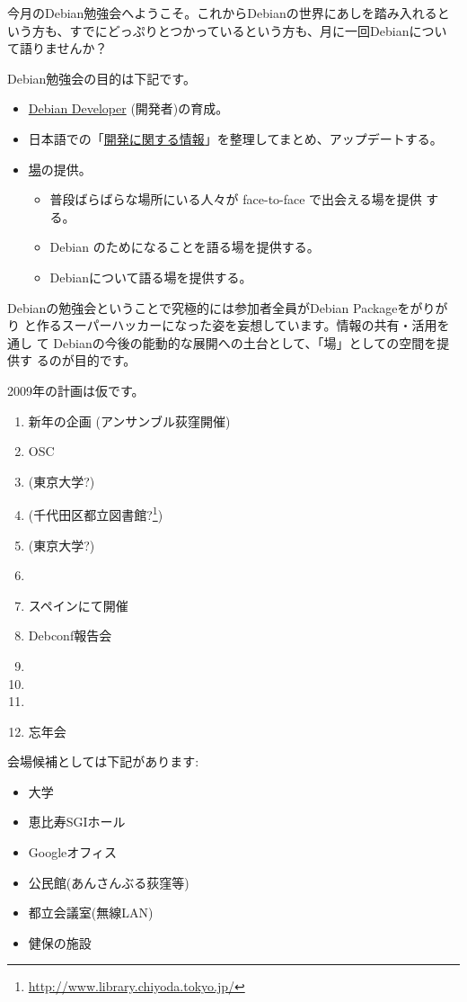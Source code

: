 \documentclass[mingoth,a4paper]{jsarticle}
\begin{document}
\begin{multicols}{2}
 
 
 今月のDebian勉強会へようこそ。これからDebianの世界にあしを踏み入れると
 いう方も、すでにどっぷりとつかっているという方も、月に一回Debianについ
 て語りませんか？

 Debian勉強会の目的は下記です。

 \begin{itemize}
 \item \underline{Debian Developer} (開発者)の育成。
 \item 日本語での「\underline{開発に関する情報}」を整理してまとめ、アップデートする。
 \item \underline{場}の提供。
 \begin{itemize}
  \item 普段ばらばらな場所にいる人々が face-to-face で出会える場を提供
	する。
  \item Debian のためになることを語る場を提供する。
  \item Debianについて語る場を提供する。
 \end{itemize}
 \end{itemize}		

 Debianの勉強会ということで究極的には参加者全員がDebian Packageをがりがり
 と作るスーパーハッカーになった姿を妄想しています。情報の共有・活用を通し
 て Debianの今後の能動的な展開への土台として、「場」としての空間を提供す
 るのが目的です。

 2009年の計画は仮です。

 \begin{enumerate}
  \item 新年の企画 (アンサンブル荻窪開催)
  \item OSC
  \item (東京大学?)
  \item (千代田区都立図書館?\footnote{\url{http://www.library.chiyoda.tokyo.jp/}})
  \item (東京大学?)
  \item 
  \item スペインにて開催
  \item Debconf報告会
  \item 
  \item 
  \item 
  \item 忘年会
 \end{enumerate}

 会場候補としては下記があります:

 \begin{itemize}
  \item 大学
  \item 恵比寿SGIホール
  \item Googleオフィス
  \item 公民館(あんさんぶる荻窪等)
  \item 都立会議室(無線LAN)
  \item 健保の施設
 \end{itemize}

\end{multicols}
\end{document}

